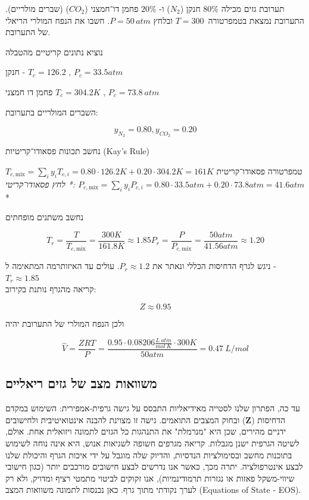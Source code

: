 \documentclass[
  hebrew,
  letterpaper,
  DIV=11,
  numbers=noendperiod]{scrreprt}
\begin{document}
תערובת גזים מכילה \(80\%\) חנקן (\(N_{2}\)) ו- \(20\%\) פחמן דו־חמצני
(\(CO_{2}\)) (שברים מולריים). התערובת נמצאת בטמפרטורה \(T = 300\,\)
ובלחץ \(P = 50\, atm\). חשבו את הנפח המולרי הריאלי של התערובת.

נוציא נתונים קריטיים מהטבלה

חנקן - \(T_{c} = 126.2\text{ , }P_{c} = 33.5atm\)

פחמן דו חמצני \(T_{c} = 304.2K\text{ , }P_{c} = 73.8\ atm\)

השברים המולריים בתערובת:

\[y_{N_{2}} = 0.80,y_{CO_{2}} = 0.20\]

נחשב תכונות פסאודו־קריטיות (Kay's Rule)

טמפרטורה פסאודו־קריטית
\(T_{c,\text{mix}} = \sum_{i}^{}y_{i}T_{c,i} = 0.80 \cdot 126.2K + 0.20 \cdot 304.2K = 161K\)\emph{*
לחץ פסאודו־קריטי:
\(P_{c,\text{mix}} = \sum_{i}^{}y_{i}P_{c,i} = 0.80 \cdot 33.5atm + 0.20 \cdot 73.8atm = 41.6atm\)}*

נחשב משתנים מופחתים

\[{T_{r} = \frac{T}{T_{c,\text{mix}}} = \frac{300K}{161.8K} \approx 1.85
}{P_{r} = \frac{P}{P_{c,\text{mix}}} = \frac{50atm}{41.56atm} \approx 1.20
}\]

ניגש לגרף הדחיסות הכללי ונאתר את \(P_{r} \approx 1.2\). עולים עד
האיזותרמה המתאימה ל - \(T_{r} \approx 1.85\)\\
קריאה מהגרף נותנת בקירוב:

\[Z \approx 0.95\]

ולכן הנפח המולרי של התערובת יהיה

\[\widehat{V} = \frac{ZRT}{P} = \frac{0.95 \cdot 0.08206\frac{L\ atm}{mol\ K} \cdot 300K}{50atm} = 0.47\ L/mol\]

\subsection{משוואות מצב של גזים
ריאליים}\label{ux5deux5e9ux5d5ux5d5ux5d0ux5d5ux5ea-ux5deux5e6ux5d1-ux5e9ux5dc-ux5d2ux5d6ux5d9ux5dd-ux5e8ux5d9ux5d0ux5dcux5d9ux5d9ux5dd}

עד כה, הפתרון שלנו לסטייה מאידיאליות התבסס על גישה גרפית-אמפירית: השימוש
במקדם הדחיסות (\(\mathbf{Z}\)) ובחוק המצבים התואמים. גישה זו מצוינת
להבנה אינטואיטיבית ולחישובים ידניים מהירים, שכן היא "מנרמלת" את התנהגות
כל הגזים לתמונה ויזואלית אחת. אולם, לשיטה הגרפית ישנן מגבלות. קריאה
מגרפים חשופה לשגיאות אנוש, היא אינה נוחה לשימוש בתוכנות מחשב ובסימולציות
הנדסיות, והדיוק שלה מוגבל על ידי איכות הגרף והיכולת שלנו לבצע
אינטרפולציה. יתרה מכך, כאשר אנו נדרשים לבצע חישובים מורכבים יותר (כגון
חישובי שיווי-משקל פאזות או נגזרות תרמודינמיות), אנו זקוקים לביטוי מתמטי
רציף ומדויק, ולא רק לערך נקודתי מתוך גרף. כאן נכנסות לתמונה משוואות המצב
(Equations of State - EOS).
\end{document}
